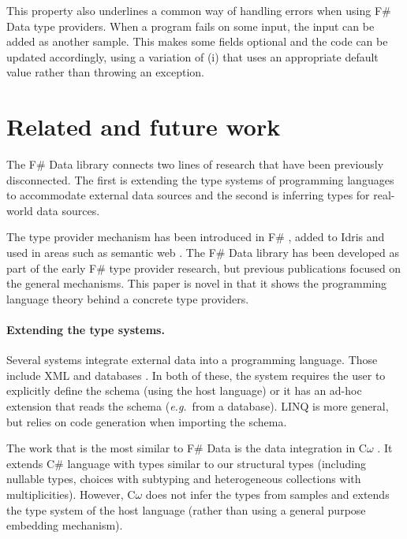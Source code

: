\documentclass[10pt,nocopyrightspace]{sigplanconf}
\begin{document}
This property also underlines a common way of handling errors when using F\# Data type providers.
When a program fails on some input, the input can be added as another sample. This makes some
fields optional and the code can be updated accordingly, using a variation of (i) that uses
an appropriate default value rather than throwing an exception.





\section{Related and future work}
\label{sec:related}

The F\# Data library connects two lines of research that have been previously disconnected. The first is
extending the type systems of programming languages to accommodate external data sources and the second
is inferring types for real-world data sources.

The type provider mechanism has been introduced in F\# \cite{fsharp-typeprov,fsharp-typeprov-ddfp},
added to Idris  \cite{idris-tp} and used in areas such as semantic web \cite{liteq}. The F\# Data
library has been developed as part of the early F\# type provider research, but previous
publications focused on the general mechanisms. This paper is novel in that it shows the
programming language theory behind a concrete type providers.

\paragraph{Extending the type systems.}
Several systems integrate external data into a programming language. Those include
XML \cite{xduce,xduce-ml} and databases \cite{links}. In both of these, the system requires
the user to explicitly define the schema (using the host language) or it has an ad-hoc extension
that reads the schema (\emph{e.g.}~from a database). LINQ \cite{linq} is more general, but relies
on code generation when importing the schema.

The work that is the most similar to F\# Data is the data integration in C$\omega$ \cite{comega-xs}.
It extends C\# language with types similar to our structural types
(including nullable types, choices with subtyping and heterogeneous collections with multiplicities).
However, C$\omega$ does not infer the types from samples and extends the type system of the host
language (rather than using a general purpose embedding mechanism).
\end{document}
